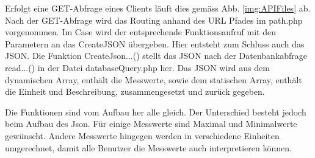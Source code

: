 Erfolgt eine GET-Abfrage eines Clients läuft dies gemäss Abb. \ref{img:APIFiles}  ab. Nach der GET-Abfrage wird das Routing anhand des URL Pfades im path.php vorgenommen. Im Case wird der entsprechende Funktionsaufruf mit den Parametern an das CreateJSON übergeben. Hier entsteht zum Schluss auch das JSON. Die Funktion CreateJson...() stellt das JSON nach der Datenbankabfrage read...() in der Datei databaseQuery.php her. Das JSON wird aus dem dynamischen Array, enthält die Messwerte, sowie dem statischen Array, enthält die Einheit und Beschreibung, zusammengesetzt und zurück gegeben.

Die Funktionen sind vom Aufbau her alle gleich. Der Unterschied besteht jedoch beim Aufbau des Json. Für einige Messwerte sind Maximal und Minimalwerte gewünscht. Andere Messwerte hingegen werden in verschiedene Einheiten umgerechnet, damit alle Benutzer die Messwerte auch interpretieren können.
